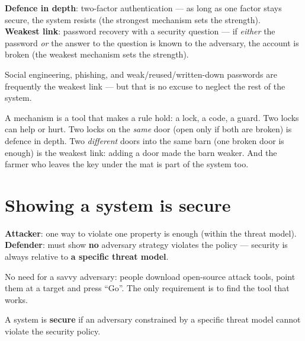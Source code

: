 \begin{exbox}[title=One example of each]
\textbf{Defence in depth}: two-factor authentication --- as long as one factor stays secure, the
system resists (the strongest mechanism sets the strength). \\
\textbf{Weakest link}: password recovery with a security question --- if \emph{either} the
password \emph{or} the answer to the question is known to the adversary, the account is broken
(the weakest mechanism sets the strength).
\end{exbox}

\begin{warnbox}[title=Humans are part of the system]
Social engineering, phishing, and weak/reused/written-down passwords are frequently the
weakest link — but that is no excuse to neglect the rest of the system.
\end{warnbox}

\begin{goatbox}
A mechanism is a tool that makes a rule hold: a lock, a code, a guard. Two locks can help or
hurt. Two locks on the \emph{same} door (open only if both are broken) is defence in depth. Two
\emph{different} doors into the same barn (one broken door is enough) is the weakest link: adding
a door made the barn weaker. And the farmer who leaves the key under the mat is part of the
system too.
\end{goatbox}

\section{Showing a system is secure}

\begin{rembox}[title=Attacker vs.\ defender]
\textbf{Attacker}: one way to violate one property is enough (within the threat model). \\
\textbf{Defender}: must show \textbf{no} adversary strategy violates the policy —
security is always relative to \textbf{a specific threat model}.
\end{rembox}

\begin{rembox}[title={``Script kiddies''}]
No need for a savvy adversary: people download open-source attack tools, point them at a target
and press ``Go''. The only requirement is to find the tool that works.
\end{rembox}

\begin{defnbox}[title=Secure]
A system is \textbf{secure} if an adversary constrained by a specific threat model
cannot violate the security policy.
\end{defnbox}

